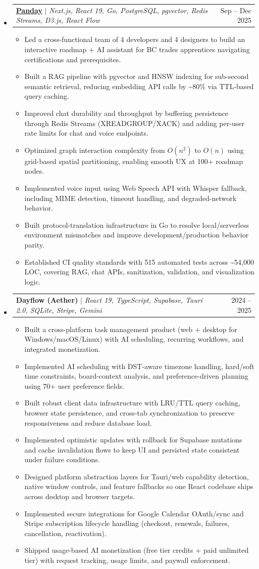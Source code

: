 \documentclass[a4paper,10pt]{article}
\makeatletter
\newcommand{\resumeItem}[1]{%
  \item\small{#1\vspace{-1pt}}%
}
\newcommand{\resumeProjectHeading}[2]{%
  \item
  \begin{tabular*}{0.97\textwidth}{l@{\extracolsep{\fill}}r}
    \small #1 & #2 \\
  \end{tabular*}\vspace{-6pt}%
}
\newcommand{\resumeItemListStart}{\begin{itemize}[itemsep=2pt]}
\newcommand{\resumeItemListEnd}{\end{itemize}\vspace{-2pt}}
\makeatother
\begin{document}
\begin{itemize}[leftmargin=0.15in, label={}]
  \resumeProjectHeading
    {\textbf{\href{https://github.com/panday-team/panday}{\underline{Panday}}}
    $|$ \emph{Next.js, React 19, Go, PostgreSQL, pgvector, Redis Streams, D3.js, React Flow}}{Sep -- Dec 2025}
  \resumeItemListStart
    \resumeItem{Led a cross-functional team of 4 developers and 4 designers to build an interactive roadmap + AI assistant for BC trades apprentices navigating certifications and prerequisites.}
    \resumeItem{Built a RAG pipeline with pgvector and HNSW indexing for sub-second semantic retrieval, reducing embedding API calls by \textasciitilde 80\% via TTL-based query caching.}
    \resumeItem{Improved chat durability and throughput by buffering persistence through Redis Streams (XREADGROUP/XACK) and adding per-user rate limits for chat and voice endpoints.}
    \resumeItem{Optimized graph interaction complexity from $O(n^2)$ to $O(n)$ using grid-based spatial partitioning, enabling smooth UX at 100+ roadmap nodes.}
    \resumeItem{Implemented voice input using Web Speech API with Whisper fallback, including MIME detection, timeout handling, and degraded-network behavior.}
    \resumeItem{Built protocol-translation infrastructure in Go to resolve local/serverless environment mismatches and improve development/production behavior parity.}
    \resumeItem{Established CI quality standards with 515 automated tests across \textasciitilde 54,000 LOC, covering RAG, chat APIs, sanitization, validation, and visualization logic.}
  \resumeItemListEnd

  \resumeProjectHeading
    {\textbf{Dayflow (Aether)} $|$ \emph{React 19, TypeScript, Supabase, Tauri 2.0, SQLite, Stripe, Gemini}}{2024 -- 2025}
  \resumeItemListStart
    \resumeItem{Built a cross-platform task management product (web + desktop for Windows/macOS/Linux) with AI scheduling, recurring workflows, and integrated monetization.}
    \resumeItem{Implemented AI scheduling with DST-aware timezone handling, hard/soft time constraints, board-context analysis, and preference-driven planning using 70+ user preference fields.}
    \resumeItem{Built robust client data infrastructure with LRU/TTL query caching, browser state persistence, and cross-tab synchronization to preserve responsiveness and reduce database load.}
    \resumeItem{Implemented optimistic updates with rollback for Supabase mutations and cache invalidation flows to keep UI and persisted state consistent under failure conditions.}
    \resumeItem{Designed platform abstraction layers for Tauri/web capability detection, native window controls, and feature fallbacks so one React codebase ships across desktop and browser targets.}
    \resumeItem{Implemented secure integrations for Google Calendar OAuth/sync and Stripe subscription lifecycle handling (checkout, renewals, failures, cancellation, reactivation).}
    \resumeItem{Shipped usage-based AI monetization (free tier credits + paid unlimited tier) with request tracking, usage limits, and paywall enforcement.}
  \resumeItemListEnd


\end{itemize}
\end{document}
